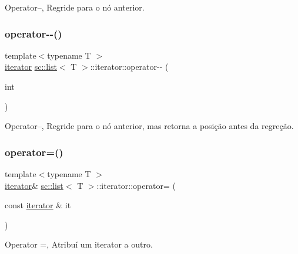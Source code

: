 Operator--, Regride para o nó anterior. \mbox{\label{classsc_1_1list_1_1iterator_ae5780db46cc0e71abd3b8be55daddded}} 
\subsubsection{\texorpdfstring{operator-\/-\/()}{operator--()}\hspace{0.1cm}{\footnotesize\ttfamily [2/2]}}
{\footnotesize\ttfamily template$<$typename T $>$ \\
\hyperlink{classsc_1_1list_1_1iterator}{iterator} \hyperlink{classsc_1_1list}{sc\+::list}$<$ T $>$\+::iterator\+::operator-\/-\/ (\begin{DoxyParamCaption}\item[{int}]{ }\end{DoxyParamCaption})\hspace{0.3cm}{\ttfamily [inline]}}

Operator--, Regride para o nó anterior, mas retorna a posição antes da regreção. \mbox{\label{classsc_1_1list_1_1iterator_aeb95f54e13863b315eea336de990cd62}} 
\subsubsection{\texorpdfstring{operator=()}{operator=()}\hspace{0.1cm}{\footnotesize\ttfamily [1/2]}}
{\footnotesize\ttfamily template$<$typename T $>$ \\
\hyperlink{classsc_1_1list_1_1iterator}{iterator}\& \hyperlink{classsc_1_1list}{sc\+::list}$<$ T $>$\+::iterator\+::operator= (\begin{DoxyParamCaption}\item[{const \hyperlink{classsc_1_1list_1_1iterator}{iterator} \&}]{it }\end{DoxyParamCaption})\hspace{0.3cm}{\ttfamily [inline]}}

Operator =, Atribuí um iterator a outro. \mbox{\label{classsc_1_1list_1_1iterator_a66f47dc6653a1c2cf0ffe5d4014cb7db}} 
